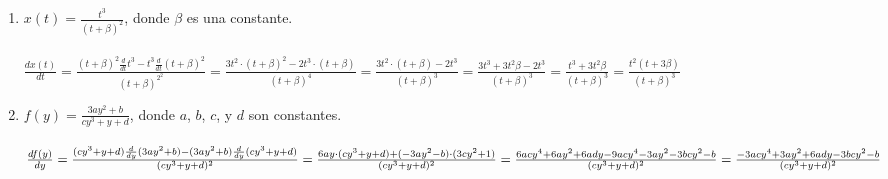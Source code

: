 \documentclass{article}
\begin{document}
\begin{enumerate}
    \item \(x(t) = \frac{t^3}{(t + \beta)^2}\), donde \(\beta\) es una constante. \\\\
    \( %
    \frac{dx(t)}{dt}
    = \frac{(t + \beta)^2\frac{d}{dt}t^3 - t^3\frac{d}{dt}(t + \beta)^2}{(t + \beta)^{2^2}}
    = \frac{3t^2 \cdot (t + \beta)^2 - 2t^3 \cdot (t + \beta)}{(t + \beta)^4}
    = \frac{3t^2 \cdot (t + \beta) - 2t^3}{(t + \beta)^3}
    = \frac{3t^3 + 3t^2\beta - 2t^3}{(t + \beta)^3}
    = \frac{t^3 + 3t^2\beta}{(t + \beta)^3}
    = \frac{t^2(t + 3\beta)}{(t + \beta)^3}
    \) %
    
    \item \(f(y) = \frac{3ay^2 + b}{cy^3 + y + d}\), donde \(a\), \(b\), \(c\), y \(d\) son constantes. \\\\
    \( %
    \frac{df(y)}{dy}
    = \frac{(cy^3 + y + d)\frac{d}{dy}(3ay^2 + b) - (3ay^2 + b)\frac{d}{dy}(cy^3 + y + d)}{(cy^3 + y + d)^2} = \frac{6ay \cdot (cy^3 + y + d) + (-3ay^2 - b) \cdot (3cy^2 + 1)}{(cy^3 + y + d)^2} \\\\
    = \frac{6acy^4+6ay^2+6ady-9acy^4-3ay^2-3bcy^2-b}{(cy^3+y+d)^2}
    = \frac{-3acy^4+3ay^2+6ady-3bcy^2-b}{(cy^3+y+d)^2}
    \) %



\end{enumerate}
\end{document}
